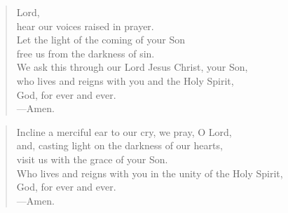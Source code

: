 \prayer

\setlength{\vleftmargin}{\prayerleftmargini}

\begin{verse}
Lord,\\
hear our voices raised in prayer.\\
Let the light of the coming of your Son\\
free us from the darkness of sin.\\
We ask this through our Lord Jesus Christ, your Son,\\
who lives and reigns with you and the Holy Spirit,\\
God, for ever and ever.\\
{\color{red}---\thinspace}Amen.
\end{verse}


\begin{verse}
Incline a merciful ear to our cry, we pray, O Lord,\\
and, casting light on the darkness of our hearts,\\
visit us with the grace of your Son.\\
Who lives and reigns with you in the unity of the Holy Spirit,\\
God, for ever and ever.\\
{\color{red}---\thinspace}Amen.
\end{verse}

\setlength{\vleftmargin}{\defleftmargini}